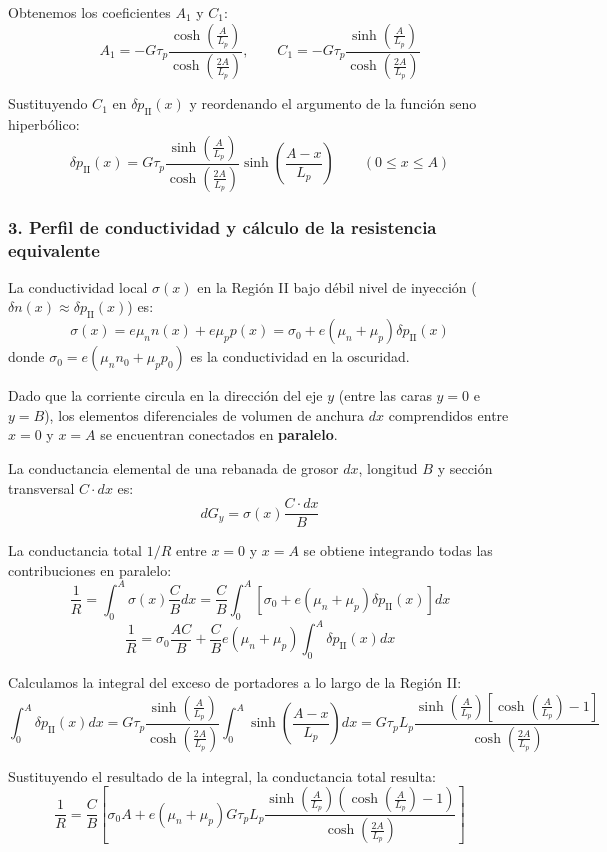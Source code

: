 \begin{problema}
Obtenemos los coeficientes $A_1$ y $C_1$:
\[
A_1 = -G \tau_p \frac{\cosh\left(\frac{A}{L_p}\right)}{\cosh\left(\frac{2A}{L_p}\right)}, \qquad C_1 = -G \tau_p \frac{\sinh\left(\frac{A}{L_p}\right)}{\cosh\left(\frac{2A}{L_p}\right)}
\]

Sustituyendo $C_1$ en $\delta p_{\text{II}}(x)$ y reordenando el argumento de la función seno hiperbólico:
\[
\delta p_{\text{II}}(x) = G \tau_p \frac{\sinh\left(\frac{A}{L_p}\right)}{\cosh\left(\frac{2A}{L_p}\right)} \sinh\left(\frac{A-x}{L_p}\right) \qquad (0 \le x \le A)
\]

\subsubsection*{3. Perfil de conductividad y cálculo de la resistencia equivalente}
La conductividad local $\sigma(x)$ en la Región II bajo débil nivel de inyección ($\delta n(x) \approx \delta p_{\text{II}}(x)$) es:
\[
\sigma(x) = e \mu_n n(x) + e \mu_p p(x) = \sigma_0 + e (\mu_n + \mu_p) \delta p_{\text{II}}(x)
\]
donde $\sigma_0 = e (\mu_n n_0 + \mu_p p_0)$ es la conductividad en la oscuridad.

Dado que la corriente circula en la dirección del eje $y$ (entre las caras $y = 0$ e $y = B$), los elementos diferenciales de volumen de anchura $dx$ comprendidos entre $x = 0$ y $x = A$ se encuentran conectados en \textbf{paralelo}.

La conductancia elemental de una rebanada de grosor $dx$, longitud $B$ y sección transversal $C \cdot dx$ es:
\[
dG_y = \sigma(x) \frac{C \cdot dx}{B}
\]

La conductancia total $1/R$ entre $x = 0$ y $x = A$ se obtiene integrando todas las contribuciones en paralelo:
\[
\frac{1}{R} = \int_0^A \sigma(x) \frac{C}{B} dx = \frac{C}{B} \int_0^A \left[ \sigma_0 + e (\mu_n + \mu_p) \delta p_{\text{II}}(x) \right] dx
\]
\[
\frac{1}{R} = \sigma_0 \frac{A C}{B} + \frac{C}{B} e (\mu_n + \mu_p) \int_0^A \delta p_{\text{II}}(x) dx
\]

Calculamos la integral del exceso de portadores a lo largo de la Región II:
\[
\int_0^A \delta p_{\text{II}}(x) dx = G \tau_p \frac{\sinh\left(\frac{A}{L_p}\right)}{\cosh\left(\frac{2A}{L_p}\right)} \int_0^A \sinh\left(\frac{A-x}{L_p}\right) dx = G \tau_p L_p \frac{\sinh\left(\frac{A}{L_p}\right) \left[ \cosh\left(\frac{A}{L_p}\right) - 1 \right]}{\cosh\left(\frac{2A}{L_p}\right)}
\]

Sustituyendo el resultado de la integral, la conductancia total resulta:
\[
\frac{1}{R} = \frac{C}{B} \left[ \sigma_0 A + e (\mu_n + \mu_p) G \tau_p L_p \frac{\sinh\left(\frac{A}{L_p}\right) \left( \cosh\left(\frac{A}{L_p}\right) - 1 \right)}{\cosh\left(\frac{2A}{L_p}\right)} \right]
\]


\end{problema}
